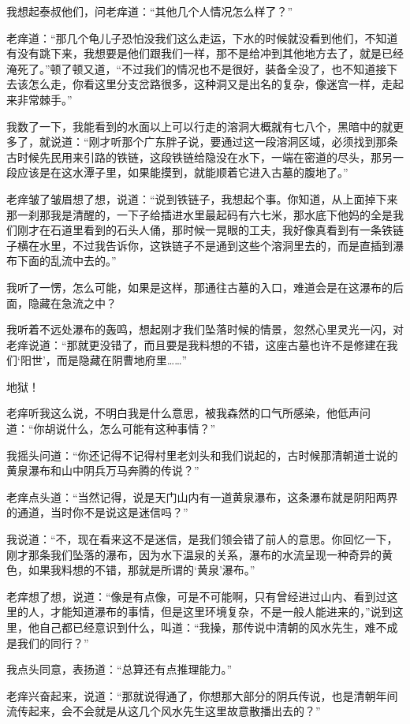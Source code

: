 我想起泰叔他们，问老痒道：“其他几个人情况怎么样了？”

老痒道：“那几个龟儿子恐怕没我们这么走运，下水的时候就没看到他们，不知道有没有跳下来，我想要是他们跟我们一样，那不是给冲到其他地方去了，就是已经淹死了。”顿了顿又道，“不过我们的情况也不是很好，装备全没了，也不知道接下去该怎么走，你看这里分支岔路很多，这种洞又是出名的复杂，像迷宫一样，走起来非常棘手。”

我数了一下，我能看到的水面以上可以行走的溶洞大概就有七八个，黑暗中的就更多了，就说道：“刚才听那个广东胖子说，要通过这一段溶洞区域，必须找到那条古时候先民用来引路的铁链，这段铁链给隐没在水下，一端在密道的尽头，那另一段应该是在这水潭子里，如果能摸到，就能顺着它进入古墓的腹地了。”

老痒皱了皱眉想了想，说道：“说到铁链子，我想起个事。你知道，从上面掉下来那一刹那我是清醒的，一下子给插进水里最起码有六七米，那水底下他妈的全是我们刚才在石道里看到的石头人俑，那时候一晃眼的工夫，我好像真看到有一条铁链子横在水里，不过我告诉你，这铁链子不是通到这些个溶洞里去的，而是直插到瀑布下面的乱流中去的。”

我听了一愣，怎么可能，如果是这样，那通往古墓的入口，难道会是在这瀑布的后面，隐藏在急流之中？

我听着不远处瀑布的轰鸣，想起刚才我们坠落时候的情景，忽然心里灵光一闪，对老痒说道：“那就更没错了，而且要是我料想的不错，这座古墓也许不是修建在我们‘阳世’，而是隐藏在阴曹地府里……”

地狱！

老痒听我这么说，不明白我是什么意思，被我森然的口气所感染，他低声问道：“你胡说什么，怎么可能有这种事情？”

我摇头问道：“你还记得不记得村里老刘头和我们说起的，古时候那清朝道士说的黄泉瀑布和山中阴兵万马奔腾的传说？”

老痒点头道：“当然记得，说是天门山内有一道黄泉瀑布，这条瀑布就是阴阳两界的通道，当时你不是说这是迷信吗？”

我说道：“不，现在看来这不是迷信，是我们领会错了前人的意思。你回忆一下，刚才那条我们坠落的瀑布，因为水下温泉的关系，瀑布的水流呈现一种奇异的黄色，如果我料想的不错，那就是所谓的‘黄泉’瀑布。”

老痒想了想，说道：“像是有点像，可是不可能啊，只有曾经进过山内、看到过这里的人，才能知道瀑布的事情，但是这里环境复杂，不是一般人能进来的，”说到这里，他自己都已经意识到什么，叫道：“我操，那传说中清朝的风水先生，难不成是我们的同行？”

我点头同意，表扬道：“总算还有点推理能力。”

老痒兴奋起来，说道：“那就说得通了，你想那大部分的阴兵传说，也是清朝年间流传起来，会不会就是从这几个风水先生这里故意散播出去的？”

